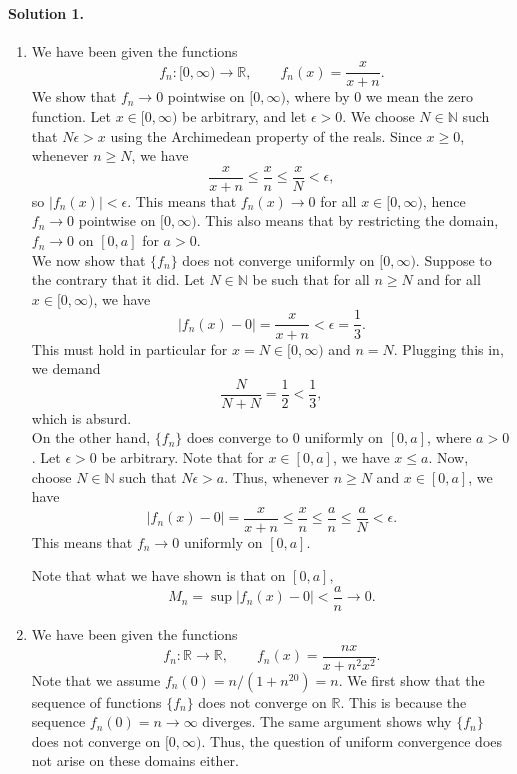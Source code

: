 \documentclass[10pt]{article}
\def\R{\mathbb{R}}
\def\N{\mathbb{N}}
\begin{document}
    \paragraph{Solution 1.}
    \begin{enumerate}
        \item We have been given the functions \[
            f_n\colon [0, \infty) \to \R, \qquad f_n(x) = \frac{x}{x + n}.
        \] We show that $f_n \to 0$ pointwise on $[0, \infty)$, where by $0$ we mean
        the zero function. Let $x \in [0, \infty)$ be arbitrary, and let $\epsilon >
        0$. We choose $N \in \N$ such that $N\epsilon > x$ using the Archimedean
        property of the reals. Since $x \geq 0$, whenever $n \geq N$, we have \[
            \frac{x}{x + n} \leq \frac{x}{n} \leq \frac{x}{N} < \epsilon,
        \] so $|f_n(x)| < \epsilon$. This means that $f_n(x) \to 0$ for all $x \in
        [0, \infty)$, hence $f_n \to 0$ pointwise on $[0, \infty)$. This also means
        that by restricting the domain, $f_n \to 0$ on $[0, a]$ for $a > 0$. \\

        We now show that $\{f_n\}$ does not converge uniformly on $[0, \infty)$.
        Suppose to the contrary that it did. Let $N \in \N$ be such that for all $n
        \geq N$ and for all $x \in [0, \infty)$, we have \[
            |f_n(x) - 0| = \frac{x}{x + n} < \epsilon = \frac{1}{3}.
        \] This must hold in particular for $x = N \in [0, \infty)$ and $n = N$.
        Plugging this in, we demand \[
            \frac{N}{N + N} = \frac{1}{2} < \frac{1}{3},
        \] which is absurd. \\

        On the other hand, $\{f_n\}$ does converge to $0$ uniformly on $[0, a]$,
        where $a > 0$. Let $\epsilon > 0$ be arbitrary. Note that for $x \in [0, a]$,
        we have $x \leq a$. Now, choose $N \in \N$ such that $N\epsilon > a$. Thus,
        whenever $n \geq N$ and $x \in [0, a]$, we have \[
            |f_n(x) - 0| = \frac{x}{x + n} \leq \frac{x}{n} \leq \frac{a}{n} \leq
            \frac{a}{N} < \epsilon.
        \] This means that $f_n \to 0$ uniformly on $[0, a]$.
        
        Note that what we have shown is that on $[0, a], $\[
            M_n = \sup |f_n(x) - 0| < \frac{a}{n} \to 0.
        \] 


        \item We have been given the functions \[
            f_n\colon \R \to \R, \qquad f_n(x) = \frac{nx}{x + n^2x^2}.
        \] Note that we assume $f_n(0) = n / (1 + n^20) = n$.
        We first show that the sequence of functions $\{f_n\}$ does not converge on
        $\R$. This is because the sequence $f_n(0) = n \to \infty$ diverges.
        The same argument shows why $\{f_n\}$ does not converge on $[0, \infty)$.
        Thus, the question of uniform convergence does not arise on these domains
        either. \\


\end{enumerate}
\end{document}
